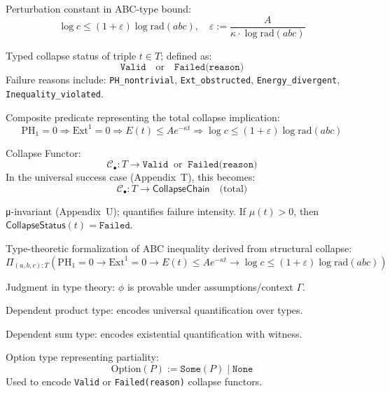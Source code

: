 \documentclass[11pt]{article}
\begin{document}
\begin{description}[leftmargin=3.2cm, labelsep=0.8cm]
\item[$\varepsilon$] 
Perturbation constant in ABC-type bound:
\[
\log c \leq (1+\varepsilon)\log \mathrm{rad}(abc), \quad
\varepsilon := \frac{A}{\kappa \cdot \log \mathrm{rad}(abc)}
\]

\item[$\mathsf{CollapseStatus}(t)$] 
Typed collapse status of triple \( t \in T \); defined as:
\[
\texttt{Valid} \quad \text{or} \quad \texttt{Failed(reason)}
\]
Failure reasons include:  
\texttt{PH\_nontrivial}, \texttt{Ext\_obstructed}, \texttt{Energy\_divergent}, \texttt{Inequality\_violated}.

\item[$\mathsf{CollapseChain}(t)$] 
Composite predicate representing the total collapse implication:
\[
\mathrm{PH}_1 = 0 \Rightarrow \mathrm{Ext}^1 = 0 \Rightarrow E(t) \leq A e^{-\kappa t} \Rightarrow \log c \leq (1+\varepsilon)\log \mathrm{rad}(abc)
\]

\item[$\mathcal{C}_\bullet$] 
Collapse Functor:
\[
\mathcal{C}_\bullet : T \longrightarrow \texttt{Valid} \;\; \text{or} \;\; \texttt{Failed(reason)}
\]
In the universal success case (Appendix~T), this becomes:
\[
\mathcal{C}_\bullet : T \to \mathsf{CollapseChain}
\quad \text{(total)}
\]

\item[$\mu(t)$] 
μ-invariant (Appendix~U); quantifies failure intensity.  
If \( \mu(t) > 0 \), then \( \mathsf{CollapseStatus}(t) = \texttt{Failed} \).

\item[$\mathsf{ABC}_{\texttt{collapse}}$] 
Type-theoretic formalization of ABC inequality derived from structural collapse:
\[
\Pi_{(a,b,c):T} \left(
\mathrm{PH}_1 = 0 \to
\mathrm{Ext}^1 = 0 \to
E(t) \leq Ae^{-\kappa t} \to
\log c \leq (1+\varepsilon) \log \mathrm{rad}(abc)
\right)
\]

\item[$\Gamma \vdash \phi : \mathrm{Prop}$] 
Judgment in type theory:  
\( \phi \) is provable under assumptions/context \( \Gamma \).

\item[$\Pi$-type] 
Dependent product type: encodes universal quantification over types.

\item[$\Sigma$-type] 
Dependent sum type: encodes existential quantification with witness.

\item[$\mathrm{Option}(P)$] 
Option type representing partiality:
\[
\mathrm{Option}(P) := \texttt{Some}(P) \;|\; \texttt{None}
\]
Used to encode \texttt{Valid} or \texttt{Failed(reason)} collapse functors.


\end{description}
\end{document}
